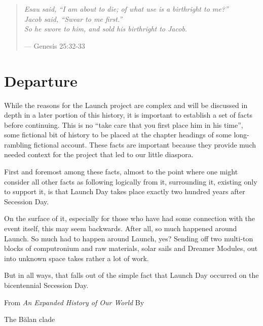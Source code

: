 \documentclass[10pt]{memoir}
\begin{document}
  \cleardoublepage
  \null
  \thispagestyle{empty}
  \vfill
  \begin{quote}
    \small
    \emph{Esau said, ``I am about to die; of what use is a birthright to me?'' \\
    Jacob said, ``Swear to me first.'' \\
    So he swore to him, and sold his birthright to Jacob.}

    --- Genesis 25:32-33
  \end{quote}
  \vfill

  \part{Departure}
  While the reasons for the Launch project are complex and will be discussed in depth in a later portion of this history, it is important to establish a set of facts before continuing. This is no “take care that you first place him in his time”, some fictional bit of history to be placed at the chapter headings of some long-rambling fictional account. These facts are important because they provide much needed context for the project that led to our little diaspora.

  First and foremost among these facts, almost to the point where one might consider all other facts as following logically from it, surrounding it, existing only to support it, is that Launch Day takes place exactly two hundred years after Secession Day.

  On the surface of it, especially for those who have had some connection with the event itself, this may seem backwards. After all, so much happened around Launch. So much had to happen around Launch, yes? Sending off two multi-ton blocks of computronium and raw materials, solar sails and Dreamer Modules, out into unknown space takes rather a lot of work.

  But in all ways, that falls out of the simple fact that Launch Day occurred on the bicentennial Secession Day.

  \vspace{1em}
  
  From \emph{An Expanded History of Our World} By

  The Bălan clade

  \vfill

  
  
  
  
\end{document}
